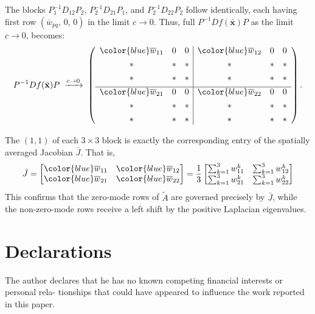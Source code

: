 \documentclass[12pt,a4paper]{article}
\theoremstyle{definition}
\begin{document}
The blocks \(P_1^{-1}D_{12}P_2\), \(P_2^{-1}D_{21}P_1\), and \(P_2^{-1}D_{22}P_2\) follow identically, each having first row \((\overline{w}_{pq},\,0,\,0)\) in the limit \(c\to 0\). Thus, full \(P^{-1}Df(\bar{\mathbf{x}})P\) as the limit \(c\to 0\), becomes:
\[
P^{-1}Df(\bar{\mathbf{x}})P \;\xrightarrow{c\to 0}\;
\left(\begin{array}{ccc|ccc}
{\color{blue}\overline{w}_{11}} & 0 & 0 & {\color{blue}\overline{w}_{12}} & 0 & 0 \\[4pt]
* & * & * & * & * & * \\[4pt]
* & * & * & * & * & * \\[4pt]
\hline
{\color{blue}\overline{w}_{21}}& 0 & 0 & {\color{blue}\overline{w}_{22}} & 0 & 0 \\[4pt]
* & * & * & * & * & * \\[4pt]
* & * & * & * & * & *
\end{array}\right).
\]


The $(1,1)$ of each $  3\times 3  $ block is exactly the corresponding entry of the spatially averaged Jacobian $  \bar{J}  $. That is, 
\[\bar{J}=\begin{bmatrix}
{\color{blue}\overline{w}_{11}} & {\color{blue}\overline{w}_{12}} \\
{\color{blue}\overline{w}_{21}} & {\color{blue}\overline{w}_{22}}  
\end{bmatrix}
=\frac{1}{3}\begin{bmatrix}
\sum_{k=1}^3 w^k_{11} & \sum_{k=1}^3 w^k_{12} \\
\sum_{k=1}^3 w^k_{21} & \sum_{k=1}^3 w^k_{22}
\end{bmatrix}
\]
This confirms that the zero-mode rows of $  \widetilde{A}  $ are governed precisely by $  \bar{J}  $, while the non-zero-mode rows receive a left shift by the positive Laplacian eigenvalues.

\section*{Declarations}
The author declares that he has no known competing financial interests or personal rela-
tionships that could have appeared to influence the work reported in this paper.
\end{document}
